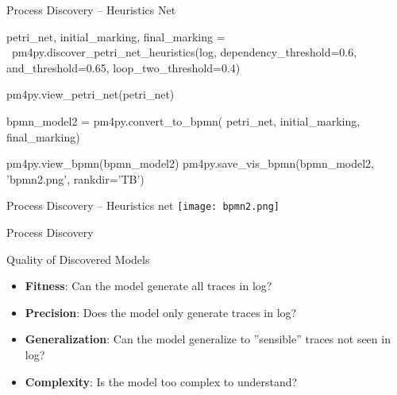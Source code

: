 \documentclass[ignorenonframetext,xcolor=x11names]{beamer}
\begin{document}
\begin{frame}[fragile]{Process Discovery -- Heuristics Net}
\footnotesize
\begin{pythoncode}
petri_net, initial_marking, final_marking = \
    pm4py.discover_petri_net_heuristics(log, 
        dependency_threshold=0.6,
        and_threshold=0.65,
        loop_two_threshold=0.4)
        
pm4py.view_petri_net(petri_net)
        
bpmn_model2 = pm4py.convert_to_bpmn(
    petri_net, initial_marking, final_marking)
    
pm4py.view_bpmn(bpmn_model2)
pm4py.save_vis_bpmn(bpmn_model2, 'bpmn2.png', rankdir='TB')
\end{pythoncode}
\end{frame}

\begin{frame}{Process Discovery -- Heuristics net}
\centering
\texttt{[image: bpmn2.png]}
\end{frame}

\begin{frame}{Process Discovery}
\begin{block}{Quality of Discovered Models}
\begin{itemize}
   \item \textbf{Fitness}: Can the model generate all traces in log?
   \item \textbf{Precision}: Does the model only generate traces in log?
   \item \textbf{Generalization}: Can the model generalize to ''sensible'' traces not seen in log?
   \item \textbf{Complexity}: Is the model too complex to understand?
\end{itemize}
\end{block}
\end{frame}
\end{document}
